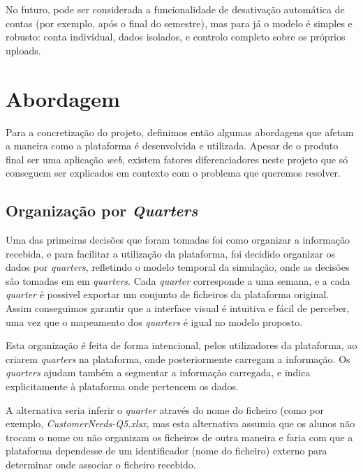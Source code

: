 No futuro, pode ser considerada a funcionalidade de desativação automática de contas (por exemplo, após o final do semestre), mas para já o modelo é simples e robusto: conta individual, dados isolados, e controlo completo sobre os próprios uploads.

\section{Abordagem}
\label{sec:abordagem}

Para a concretização do projeto, definimos então algumas abordagens que afetam a maneira como a plataforma é desenvolvida e utilizada. Apesar de o produto final ser uma aplicação \textit{web}, existem fatores diferenciadores neste projeto que só conseguem ser explicados em contexto com o problema que queremos resolver.
 
\subsection{Organização por \textit{Quarters}}

Uma das primeiras decisões que foram tomadas foi como organizar a informação recebida, e para facilitar a utilização da plataforma,  foi decidido organizar os dados por \textit{quarters}, refletindo o modelo temporal da simulação, onde as decisões são tomadas em em \textit{quarters}. Cada \textit{quarter} corresponde a uma semana, e a cada \textit{quarter} é possivel exportar um conjunto de ficheiros da plataforma original.  Assim conseguimos garantir que a interface visual é intuitiva e fácil de perceber, uma vez que o mapeamento dos \textit{quarters} é igual no modelo proposto. 

Esta organização é feita de forma intencional, pelos utilizadores da plataforma, ao criarem \textit{quarters} na plataforma, onde posteriormente carregam a informação. Os \textit{quarters} ajudam também a segmentar a informação carregada, e indica explicitamente à plataforma onde pertencem os dados.

 A alternativa seria inferir o \textit{quarter} através do nome do ficheiro (como por exemplo, \textit{CustomerNeeds-Q5.xlsx}, mas esta alternativa assumia que os alunos não trocam o nome ou não organizam os ficheiros de outra maneira e faria com que a plataforma dependesse de um identificador (nome do ficheiro) externo para determinar onde associar o ficheiro recebido.

